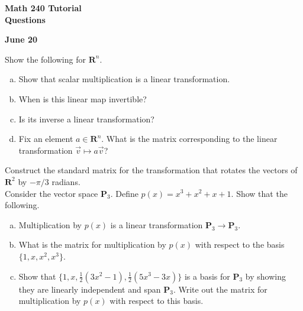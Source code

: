 \documentclass[a4paper,11pt]{article}
\newcommand{\R}{\mathbf{R}}
\newcommand{\PP}{\mathbf{P}}
\begin{document}
\begin{center}
  {\Large\bfseries Math 240 Tutorial \\ Questions}
\end{center}
\begin{center}
  {\bfseries June 20}
\end{center}

 Show the following for $\R^n$.
\begin{enumerate}[(a)]
\item Show that scalar multiplication is a linear transformation.
\item When is this linear map invertible?
\item Is its inverse a linear transformation?
\item Fix an element $a \in \R^n$. What is the matrix corresponding to the
  linear transformation $\vec v \mapsto a\vec v$? \\
\end{enumerate}

 Construct the standard matrix for the
transformation that rotates the vectors of $\R^2$ by $-\pi/3$ radians. \\

 Consider the vector space $\PP_3$. Define $p(x) =
x^3 + x^2 + x + 1$. Show that the following.
\begin{enumerate}[(a)]
\item Multiplication by $p(x)$ is a linear transformation $\PP_3 \rightarrow
  \PP_3$.
\item What is the matrix for multiplication by $p(x)$ with respect to the basis
  $\{1,x,x^2,x^3\}$.
\item Show that $\{1,x,\frac{1}{2}(3x^2-1),\frac{1}{2}(5x^3-3x)\}$ is a basis
  for $\PP_3$ by showing they are linearly independent and span $\PP_3$. Write
  out the matrix for multiplication by $p(x)$ with respect to this basis. \\
\end{enumerate}
\end{document}
